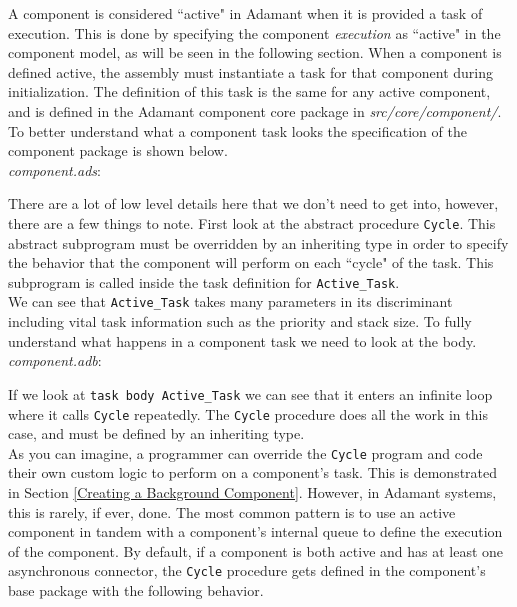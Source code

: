 A component is considered ``active" in Adamant when it is provided a task of execution. This is done by specifying the component \textit{execution} as ``active" in the component model, as will be seen in the following section. When a component is defined active, the assembly must instantiate a task for that component during initialization. The definition of this task is the same for any active component, and is defined in the Adamant component core package in \textit{src/core/component/}. To better understand what a component task looks the specification of the component package is shown below. \\

\textit{component.ads}:

There are a lot of low level details here that we don't need to get into, however, there are a few things to note. First look at the abstract procedure \texttt{Cycle}. This abstract subprogram must be overridden by an inheriting type in order to specify the behavior that the component will perform on each ``cycle" of the task. This subprogram is called inside the task definition for \texttt{Active\_Task}. \\

We can see that \texttt{Active\_Task} takes many parameters in its discriminant including vital task information such as the priority and stack size. To fully understand what happens in a component task we need to look at the body. \\

\textit{component.adb}:

If we look at \texttt{task body Active\_Task} we can see that it enters an infinite loop where it calls \texttt{Cycle} repeatedly. The \texttt{Cycle} procedure does all the work in this case, and must be defined by an inheriting type. \\

As you can imagine, a programmer can override the \texttt{Cycle} program and code their own custom logic to perform on a component's task. This is demonstrated in Section \ref{Creating a Background Component}. However, in Adamant systems, this is rarely, if ever, done. The most common pattern is to use an active component in tandem with a component's internal queue to define the execution of the component. By default, if a component is both active and has at least one asynchronous connector, the \texttt{Cycle} procedure gets defined in the component's base package with the following behavior. \\

